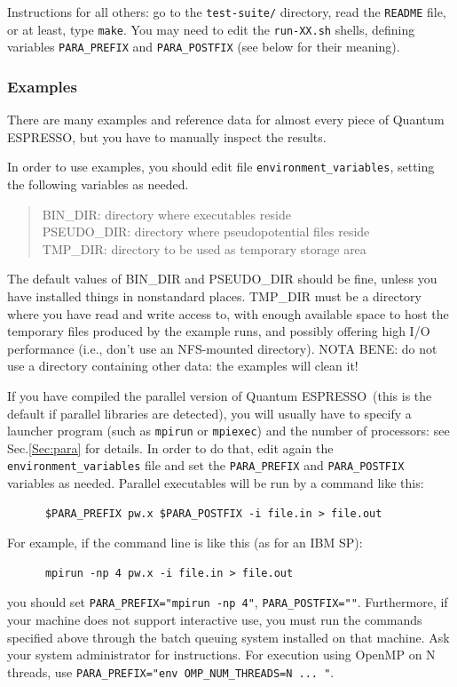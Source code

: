 \documentclass[12pt,a4paper]{article}
\def\qe{{\sc Quantum ESPRESSO}}
\def\make{\texttt{make}}
\begin{document}
Instructions for all others: go to the \texttt{test-suite/} directory,
read the \texttt{README} file, or at least, type \make. You may need
to edit the \texttt{run-XX.sh} shells, defining variables
\texttt{PARA\_PREFIX} and \texttt{PARA\_POSTFIX} (see below for their
meaning).

\subsubsection{Examples}
\label{SubSec:Examples}
There are many examples and reference data for almost every piece of \qe,
but you have to manually inspect the results.

In order to use examples, you should edit file \texttt{environment\_variables},
setting the following variables as needed.
\begin{quote}
   BIN\_DIR: directory where executables reside\\
   PSEUDO\_DIR: directory where pseudopotential files reside\\
   TMP\_DIR: directory to be used as temporary storage area
\end{quote}
The default values of BIN\_DIR and PSEUDO\_DIR should be fine,
unless you have installed things in nonstandard places. TMP\_DIR
must be a directory where you have read and write access to, with
enough available space to host the temporary files produced by the
example runs, and possibly offering high I/O performance (i.e., don't
use an NFS-mounted directory). NOTA BENE: do not use a
directory containing other data: the examples will clean it!

If you have compiled the parallel version of \qe\ (this
is the default if parallel libraries are detected), you will usually
have to specify a launcher program (such as \texttt{mpirun} or
\texttt{mpiexec}) and the number of processors: see Sec.\ref{Sec:para} for
details. In order to do that, edit again the \texttt{environment\_variables}
file and set the \texttt{PARA\_PREFIX} and \texttt{PARA\_POSTFIX} variables
as needed. Parallel executables will be run by a command like this:
\begin{verbatim}
      $PARA_PREFIX pw.x $PARA_POSTFIX -i file.in > file.out
\end{verbatim}
For example, if the command line is like this (as for an IBM SP):
\begin{verbatim}
      mpirun -np 4 pw.x -i file.in > file.out
\end{verbatim}
you should set \texttt{PARA\_PREFIX="mpirun -np 4"},
\texttt{PARA\_POSTFIX=""}.
Furthermore, if your machine does not support interactive use, you
must run the commands specified above through the batch queuing
system installed on that machine. Ask your system administrator for
instructions. For execution using OpenMP on N threads,
use \texttt{PARA\_PREFIX="env OMP\_NUM\_THREADS=N ... "}.
\end{document}
